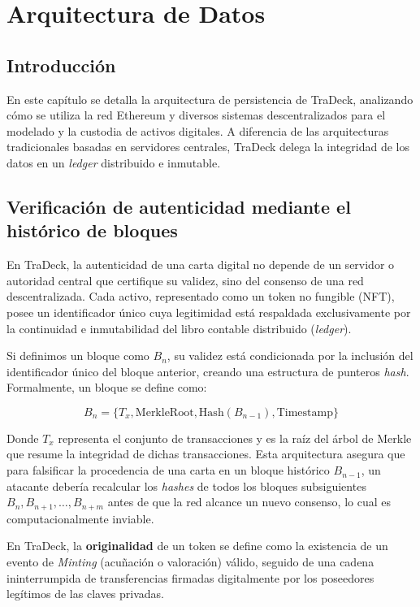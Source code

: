 \chapter{Arquitectura de Datos}\label{cap:arquitectura}
\section{Introducción}
En este capítulo se detalla la arquitectura de persistencia de TraDeck, analizando cómo se utiliza la red Ethereum y diversos sistemas descentralizados para el modelado y la custodia de activos digitales. A diferencia de las arquitecturas tradicionales basadas en servidores centrales, TraDeck delega la integridad de los datos en un \textit{ledger} distribuido e inmutable\textbf{\cite{ethereum_whitepaper}}.

\section{Verificación de autenticidad mediante el histórico de bloques}
En TraDeck, la autenticidad de una carta digital no depende de un servidor o autoridad central que 
certifique su validez, sino del consenso de una red descentralizada. Cada activo, representado como 
un token no fungible (NFT), posee un identificador único cuya legitimidad está respaldada exclusivamente 
por la continuidad e inmutabilidad del libro contable distribuido (\textit{ledger}).

Si definimos un bloque como $B_n$, su validez está condicionada por la inclusión del identificador 
único del bloque anterior, creando una estructura de punteros \textit{hash}. Formalmente, un bloque 
se define como:

\begin{equation}
	B_n = \{T_x, \text{MerkleRoot}, \text{Hash}(B_{n-1}), \text{Timestamp}\}
\end{equation}

Donde $T_x$ representa el conjunto de transacciones y  es la raíz del árbol de Merkle que resume la integridad de dichas transacciones\textbf{\cite{nakamoto2008bitcoin}}. Esta arquitectura asegura que para falsificar la procedencia de una carta en un bloque histórico $B_{n-1}$, un atacante debería recalcular los \textit{hashes} de todos los bloques subsiguientes $B_n, B_{n+1}, \dots, B_{n+m}$ antes de que la red alcance un nuevo consenso, lo cual es computacionalmente inviable.

En TraDeck, la \textbf{originalidad} de un token se define como la existencia de un evento de \textit{Minting} (acuñación o valoración) válido, seguido de una cadena ininterrumpida de transferencias firmadas digitalmente por los poseedores legítimos de las claves privadas.

